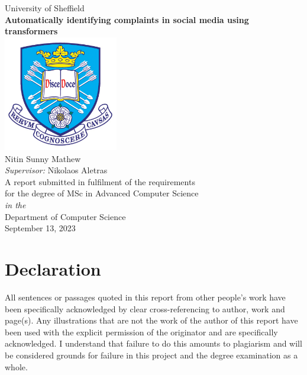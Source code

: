 \documentclass[11pt,oneside]{book}
\begin{document}
\frontmatter

\begin{titlepage}


\begin{center}
{\LARGE University of Sheffield}\\[1.5cm]
\linespread{1.2}\huge {\bfseries Automatically identifying complaints in social media using transformers}\\[1.5cm]
\linespread{1}
\includegraphics[width=5cm]{images/tuoslogo.png}\\[1cm]
{\Large Nitin Sunny Mathew}\\[1cm]
{\large \emph{Supervisor:} Nikolaos Aletras}\\[1cm]
\large A report submitted in fulfilment of the requirements\\ for the degree of MSc in Advanced Computer Science\\[0.3cm] 
\textit{in the}\\[0.3cm]
Department of Computer Science\\[2cm]
September 13, 2023
\end{center}

\end{titlepage}


\newpage
\chapter*{\Large Declaration}


All sentences or passages quoted in this report from other people's work have been specifically acknowledged by clear cross-referencing to author, work and page(s). Any illustrations that are not the work of the author of this report have been used with the explicit permission of the originator and are specifically acknowledged. I understand that failure to do this amounts to plagiarism and will be considered grounds for failure in this project and the degree examination as a whole.\\[1cm]
\end{document}
